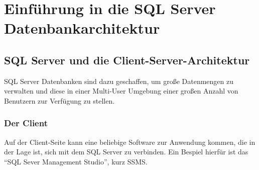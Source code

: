   \chapter{Einführung in die SQL Server Datenbankarchitektur}
  \chaptertoc{}
  \cleardoubleevenpage
    \section{SQL Server und die Client-Server-Architektur}
      SQL Server Datenbanken sind dazu geschaffen, um große Datenmengen zu
      verwalten und diese in einer Multi-User Umgebung einer großen Anzahl von
      Benutzern zur Verfügung zu stellen.
      \subsection{Der Client}
        Auf der Client-Seite kann eine beliebige Software zur Anwendung
        kommen, die in der Lage ist, sich mit dem SQL Server zu verbinden. Ein Bespiel
        hierfür ist das \enquote{SQL Sever Management Studio}, kurz SSMS.
